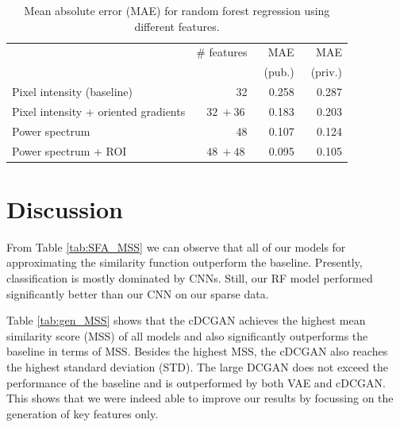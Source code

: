\documentclass[10pt,conference,compsocconf]{IEEEtran}
\begin{document}
\begin{table}\centering
    \begin{tabular}{lrrr}
    \toprule
        & \# features & MAE & MAE \\
        & & ~(pub.) & ~(priv.) \\
    \midrule
        Pixel intensity (baseline) & \SI{32}{} & \SI{0.258}{} & \SI{0.287}{}  \\
        Pixel intensity + oriented gradients & $\SI{32}{} + \SI{36}{}$ & \SI{0.183}{} & \SI{0.203}{} \\
        Power spectrum & \SI{48}{} & \SI{0.107}{} & \SI{0.124}{} \\
        Power spectrum + ROI & $\SI{48}{} + \SI{48}{}$ & \SI{0.095}{} & \SI{0.105}{} \\
    \bottomrule
    \end{tabular}
\caption{Mean absolute error (MAE) for random forest regression using different features.}
\label{tab:RF}
\end{table}

\section{Discussion}

From Table \ref{tab:SFA_MSS} we can observe that all of our models for approximating the similarity function outperform the baseline. Presently, classification is mostly dominated by CNNs. Still, our RF model performed significantly better than our CNN on our sparse data. 

Table \ref{tab:gen_MSS} shows that the cDCGAN achieves the highest mean similarity score (MSS) of all models and also significantly outperforms the baseline in terms of MSS. Besides the highest MSS, the cDCGAN also reaches the highest standard deviation (STD). The large DCGAN does not exceed the performance of the baseline and is outperformed by both VAE and cDCGAN. This shows that we were indeed able to improve our results by focussing on the generation of key features only.


\end{document}
